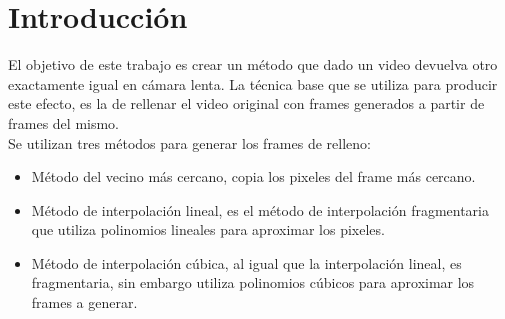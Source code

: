 \section{Introducción}

El objetivo de este trabajo es crear un método que dado un video devuelva otro exactamente igual en cámara lenta. La técnica base que se utiliza para producir este efecto, es la de rellenar el video original con frames generados a partir de frames del mismo.\\

Se utilizan tres métodos para generar los frames de relleno:
\begin{itemize}
\item Método del vecino más cercano, copia los pixeles del frame más cercano.
\item Método de interpolación lineal, es el método de interpolación fragmentaria que utiliza polinomios lineales para aproximar los pixeles.
\item Método de interpolación cúbica, al igual que la interpolación lineal, es fragmentaria, sin embargo utiliza polinomios cúbicos para aproximar los frames a generar.
\end{itemize}

